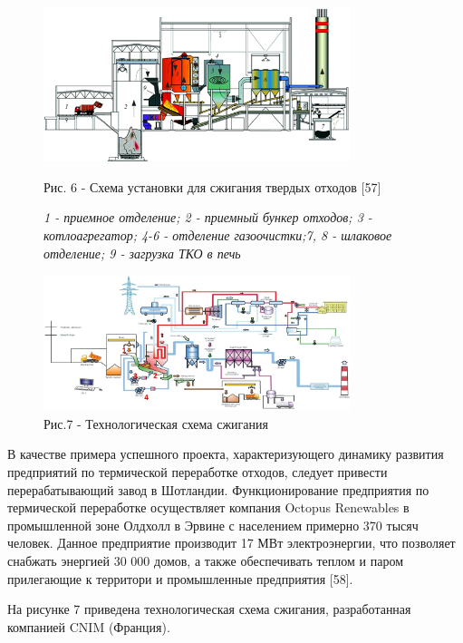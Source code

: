\begin{figure}[H]
	\centering
	\includegraphics[width=0.8\textwidth]{media/chem2/image69}
	\caption*{Рис. 6 - Схема установки для сжигания твердых отходов {[}57{]}}
	\caption*{\normalfont\emph{1 - приемное отделение; 2 - приемный бункер отходов; 3 -
котлоагрегатор; 4-6 - отделение газоочистки;7, 8 - шлаковое отделение; 9
- загрузка ТКО в печь}}
\end{figure}
\begin{figure}[H]
	\centering
	\includegraphics[width=0.8\textwidth]{media/chem2/image70}
	\caption*{Рис.7 - Технологическая схема сжигания}
\end{figure}

\begin{multicols}{2}
В качестве примера успешного проекта, характеризующего динамику развития
предприятий по термической переработке отходов, следует привести
перерабатывающий завод в Шотландии. Функционирование предприятия по
термической переработке осуществляет компания Octopus Renewables в
промышленной зоне Олдхолл в Эрвине с населением примерно 370 тысяч
человек. Данное предприятие производит 17 МВт электроэнергии, что
позволяет снабжать энергией 30 000 домов, а также обеспечивать теплом и
паром прилегающие к территори и промышленные предприятия {[}58{]}.

На рисунке 7 приведена технологическая схема сжигания, разработанная
компанией CNIM (Франция).
\end{multicols}

